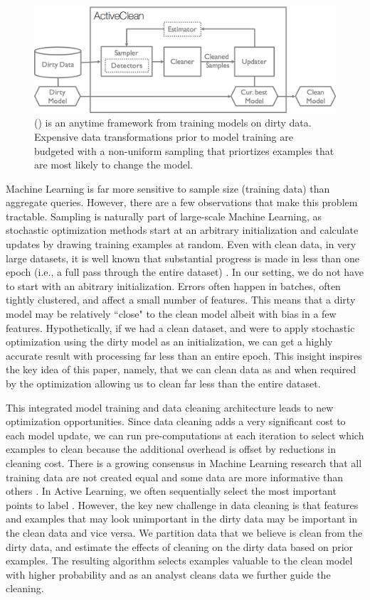 \begin{figure}[t]
\centering
 \includegraphics[width=0.6\columnwidth]{figs/arch.png}
 \caption{\sysfull (\sys) is an anytime framework from training models on dirty data. Expensive data transformations prior to model training are budgeted with a non-uniform sampling that priortizes examples that are most likely to change the model.  \label{sys-arch}}
\end{figure}

Machine Learning is far more sensitive to sample size (training data) than aggregate queries.
However, there are a few observations that make this problem tractable.
Sampling is naturally part of large-scale Machine Learning, as stochastic optimization methods start at an arbitrary initialization and calculate updates by drawing training examples at random. 
Even with clean data, in very large datasets, it is well known that substantial progress is made in less than one epoch (i.e., a full pass through the entire dataset) \cite{bottou2012stochastic}.
In our setting, we do not have to start with an abitrary initialization.
Errors often happen in batches, often tightly clustered, and affect a small number of features.
This means that a dirty model may be relatively ``close" to the clean model albeit with bias in a few features.
Hypothetically, if we had a clean dataset, and were to apply stochastic optimization using the dirty model as an initialization, we can get a highly accurate result with processing far less than an entire epoch.
This insight inspires the key idea of this paper, namely, that we can clean data as and when required by the optimization allowing us to clean far less than the entire dataset.

This integrated model training and data cleaning architecture leads to new optimization opportunities.
Since data cleaning adds a very significant cost to each model update, we can run pre-computations at each iteration to select which examples to clean because the additional overhead is offset by reductions in cleaning cost.
There is a growing consensus in Machine Learning research that all training data are not created equal and some data are more informative than others \cite{drineas2012fast, settles2010active}.
In Active Learning, we often sequentially select the most important points to label \cite{settles2010active}.
However, the key new challenge in data cleaning is that features and examples that may look unimportant in the dirty data may be important in the clean data and vice versa.
We partition data that we believe is clean from the dirty data, and estimate the effects of cleaning on the dirty data based on prior examples.
The resulting algorithm selects examples valuable to the clean model with higher probability and as an analyst cleans data we further guide the cleaning.

